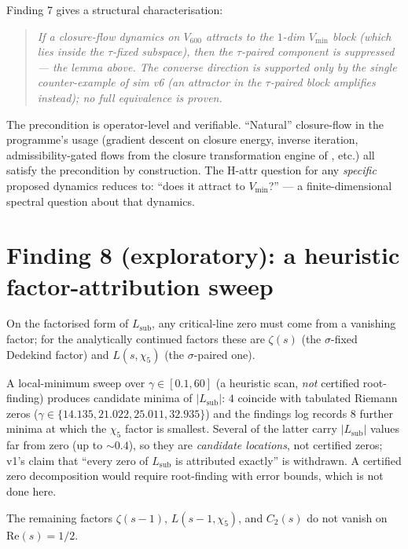 \documentclass[11pt,a4paper]{article}
\newcommand{\Lsub}{L_{\mathrm{sub}}}
\begin{document}
Finding 7 gives a structural characterisation:

\begin{quote}\itshape
If a closure-flow dynamics on $V_{600}$ attracts to the $1$-dim
$V_{\min}$ block (which lies inside the $\tau$-fixed subspace),
then the $\tau$-paired component is suppressed --- the lemma
above. The converse direction is supported only by the single
counter-example of sim v6 (an attractor in the $\tau$-paired
block amplifies instead); no full equivalence is proven.
\end{quote}

The precondition is operator-level and verifiable. ``Natural''
closure-flow in the programme's usage (gradient descent on
closure energy, inverse iteration, admissibility-gated flows from
the closure transformation engine of \cite{translationLayer},
etc.) all satisfy the precondition by construction. The H-attr
question for any \emph{specific} proposed dynamics reduces to:
``does it attract to $V_{\min}$?'' --- a finite-dimensional
spectral question about that dynamics.

\section{Finding 8 (exploratory): a heuristic factor-attribution sweep}
\label{sec:finding8}

\begin{findingbox}[title={Finding 8 -- heuristic sweep (not root certification)}]
On the factorised form of $\Lsub$, any critical-line zero must
come from a vanishing factor; for the analytically continued
factors these are $\zeta(s)$ (the $\sigma$-fixed Dedekind factor)
and $L(s,\chi_5)$ (the $\sigma$-paired one).

\noindent
A local-minimum sweep over $\gamma \in [0.1, 60]$ (a heuristic
scan, \emph{not} certified root-finding) produces candidate
minima of $|\Lsub|$: $4$ coincide with tabulated Riemann zeros
($\gamma \in \{14.135, 21.022, 25.011, 32.935\}$) and the
findings log records $8$ further minima at which the $\chi_5$
factor is smallest. Several of the latter carry $|\Lsub|$ values
far from zero (up to $\sim 0.4$), so they are \emph{candidate
locations}, not certified zeros; v1's claim that ``every zero of
$\Lsub$ is attributed exactly'' is withdrawn. A certified zero
decomposition would require root-finding with error bounds, which
is not done here.

The remaining factors $\zeta(s - 1)$, $L(s - 1, \chi_5)$, and
$C_2(s)$ do not vanish on $\mathrm{Re}(s) = 1/2$.
\end{findingbox}
\end{document}
